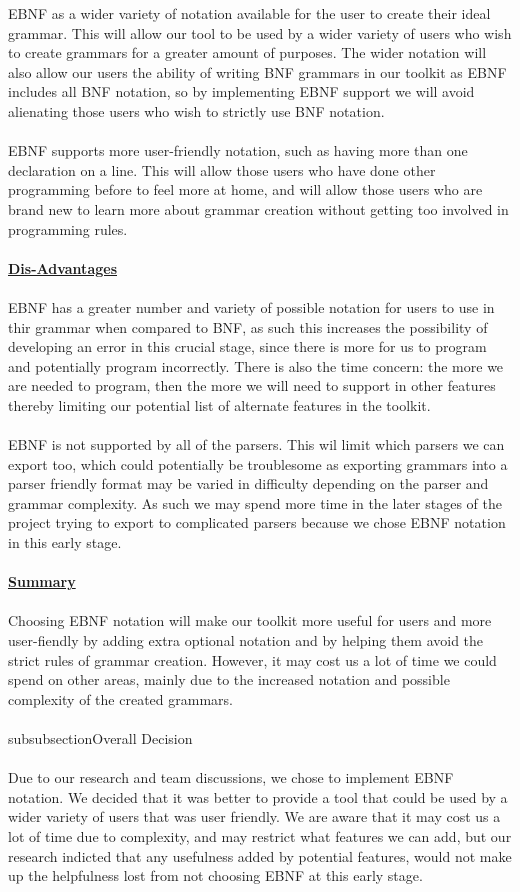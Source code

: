 EBNF as a wider variety of notation available for the user to create their ideal grammar. This will allow our tool to be used by a wider variety of users who wish to create grammars for a greater amount of purposes. The wider notation will also allow our users the ability of writing BNF grammars in our toolkit as EBNF includes all BNF notation, so by implementing EBNF support we will avoid alienating those users who wish to strictly use BNF notation. \\
\\
EBNF supports more user-friendly notation, such as having more than one declaration on a line. This will allow those users who have done other programming before to feel more at home, and will allow those users who are brand new to learn more about grammar creation without getting too involved in programming rules.\\
\\
\textbf {\underline{Dis-Advantages}}\\
\\
EBNF has a greater number and variety of possible notation for users to use in thir grammar when compared to BNF, as such this increases the possibility of developing an error in this crucial stage, since there is more for us to program and potentially program incorrectly. There is also the time concern: the more we are needed to program, then the more we will need to support in other features thereby limiting our potential list of alternate features in the toolkit.\\
\\
EBNF is not supported by all of the parsers. This wil limit which parsers we can export too, which could potentially be troublesome as exporting grammars into a parser friendly format may be varied in difficulty depending on the parser and grammar complexity. As such we may spend more time in the later stages of the project trying to export to complicated parsers because we chose EBNF notation in this early stage.\\
\\
\textbf {\underline{Summary}}\\
\\
Choosing EBNF notation will make our toolkit more useful for users and more user-fiendly by adding extra optional notation and by helping them avoid the strict rules of grammar creation. However, it may cost us a lot of time we could spend on other areas, mainly due to the increased notation and possible complexity of the created grammars.\\
\\subsubsection{Overall Decision}\\
\\
Due to our research and team discussions, we chose to implement EBNF notation. We decided that it was better to provide a tool that could be used by a wider variety of users that was user friendly. We are aware that it may cost us a lot of time due to complexity, and may restrict what features we can add, but our research indicted that any usefulness added by potential features, would not make up the helpfulness lost from not choosing EBNF at this early stage. \\
\\

